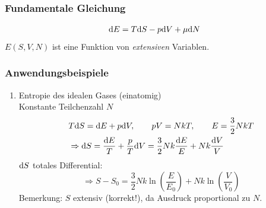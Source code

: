 \subsubsection{Fundamentale Gleichung}
\begin{equation}
    \label{eq:fundamentalEQ}
    \mathrm{d} E = T \mathrm{d} S - p \mathrm{d} V + \mu \mathrm{d} N
\end{equation}
$E(S, V, N)$ ist eine Funktion von \emph{extensiven} Variablen.

\subsubsection{Anwendungsbeispiele}
\begin{enumerate}
    \item Entropie des idealen Gases (einatomig) \\
    Konstante Teilchenzahl $N$
    \begin{equation}
        \begin{split}
            & T \mathrm{d} S = \mathrm{d} E + p \mathrm{d} V, \qquad p V = N k T, \qquad E = \frac{3}{2} N k T \\
            & \Rightarrow \mathrm{d} S = \frac{\mathrm{d} E}{T} + \frac{p}{T} \mathrm{d} V = \frac{3}{2} N k \frac{\mathrm{d} E}{E} + N k \frac{\mathrm{d} V}{V}
        \end{split}
    \end{equation}
    $\mathrm{d} S$ totales Differential:
    \begin{equation}
        \Rightarrow S - S_0 = \frac{3}{2} N k \ln (\frac{E}{E_0}) + N k \ln (\frac{V}{V_0})
    \end{equation}
    Bemerkung: $S$ extensiv (korrekt!), da Ausdruck proportional zu $N$.

\end{enumerate}
